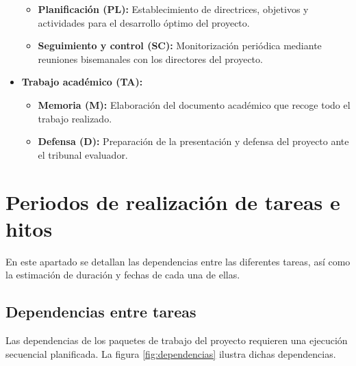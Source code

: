 \begin{itemize}
    \begin{itemize}
      \item\textbf{Planificación (PL):} Establecimiento de directrices, objetivos y actividades para el desarrollo óptimo del proyecto.
      \item\textbf{Seguimiento y control (SC):} Monitorización periódica mediante reuniones bisemanales con los directores del proyecto.
    \end{itemize}
  \item\textbf{Trabajo académico (TA):}
    \begin{itemize}
      \item\textbf{Memoria (M):} Elaboración del documento académico que recoge todo el trabajo realizado.
      \item\textbf{Defensa (D):} Preparación de la presentación y defensa del proyecto ante el tribunal evaluador.
    \end{itemize}
\end{itemize}

\section{Periodos de realización de tareas e hitos}
En este apartado se detallan las dependencias entre las diferentes tareas, así como la estimación de duración y fechas de cada una de ellas.

\subsection{Dependencias entre tareas}
Las dependencias de los paquetes de trabajo del proyecto requieren una ejecución secuencial planificada. La figura \ref{fig:dependencias} ilustra dichas dependencias.


